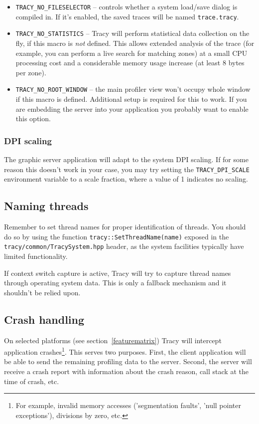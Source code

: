 \documentclass[hidelinks,titlepage,a4paper]{article}
\begin{document}
\begin{itemize}
\item \texttt{TRACY\_NO\_FILESELECTOR} -- controls whether a system load/save dialog is compiled in. If it's enabled, the saved traces will be named \texttt{trace.tracy}.
\item \texttt{TRACY\_NO\_STATISTICS} -- Tracy will perform statistical data collection on the fly, if this macro is \emph{not} defined. This allows extended analysis of the trace (for example, you can perform a live search for matching zones) at a small CPU processing cost and a considerable memory usage increase (at least 8 bytes per zone).
\item \texttt{TRACY\_NO\_ROOT\_WINDOW} -- the main profiler view won't occupy whole window if this macro is defined. Additional setup is required for this to work. If you are embedding the server into your application you probably want to enable this option.
\end{itemize}

\subsubsection{DPI scaling}

The graphic server application will adapt to the system DPI scaling. If for some reason this doesn't work in your case, you may try setting the \texttt{TRACY\_DPI\_SCALE} environment variable to a scale fraction, where a value of 1 indicates no scaling.

\subsection{Naming threads}
\label{namingthreads}

Remember to set thread names for proper identification of threads. You should do so by using the function \texttt{tracy::SetThreadName(name)} exposed in the \texttt{tracy/common/TracySystem.hpp} header, as the system facilities typically have limited functionality.

If context switch capture is active, Tracy will try to capture thread names through operating system data. This is only a fallback mechanism and it shouldn't be relied upon.

\subsection{Crash handling}
\label{crashhandling}

On selected platforms (see section~\ref{featurematrix}) Tracy will intercept application crashes\footnote{For example, invalid memory accesses ('segmentation faults', 'null pointer exceptions'), divisions by zero, etc.}. This serves two purposes. First, the client application will be able to send the remaining profiling data to the server. Second, the server will receive a crash report with information about the crash reason, call stack at the time of crash, etc.
\end{document}
